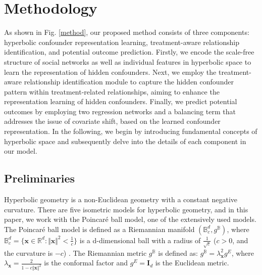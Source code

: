 \documentclass[twoside,leqno,twocolumn]{article}
\begin{document}
\section{Methodology} 
As shown in Fig. \ref{method}, our proposed method consists of three components: hyperbolic confounder representation learning, treatment-aware relationship identification, and potential outcome prediction. 
Firstly, we encode the scale-free structure of social networks as well as individual features in hyperbolic space to learn the representation of hidden confounders.
Next, we employ the treatment-aware relationship identification module to capture the hidden confounder pattern within treatment-related relationships, aiming to enhance the representation learning of hidden confounders.
Finally, we predict potential outcomes by employing two regression networks and a balancing term that addresses the issue of covariate shift, based on the learned confounder representation. 
In the following, we begin by introducing fundamental concepts of hyperbolic space and subsequently delve into the details of each component in our model.
\vspace{-0.8em}
\subsection{Preliminaries\label{sec:preliminaries}}
Hyperbolic geometry is a non-Euclidean geometry with a constant negative curvature. There are five isometric models for hyperbolic geometry, and in this paper, we work with the Poincar\'{e} ball model, one of the extensively used models. 
The Poincar\'{e} ball model is defined as a Riemannian manifold $(\mathbb{B}^d_c, g^\mathbb{B})$, where $\mathbb{B}^d_c=\{{\mathbf{x} \in \mathbb{R}^d: {\Vert \mathbf{x} \Vert}^2<\frac{1}{c}}\}$ is a d-dimensional ball with a radius of $\frac{1}{\sqrt{c}}$ ($c>0$, and the curvature is $-{c}$) \cite{ma2021knowledge}.
The Riemannian metric $g^\mathbb{B}$ is defined as: $ g^\mathbb{B}=\lambda_\mathbf{x}^2g^{E}$,
where $\lambda_\mathbf{x}=\frac{2}{1-c{\Vert \mathbf{x} \Vert}^2}$ is the conformal factor and $g^{E}=\mathbf{I}_d$ is the Euclidean metric.
\end{document}
